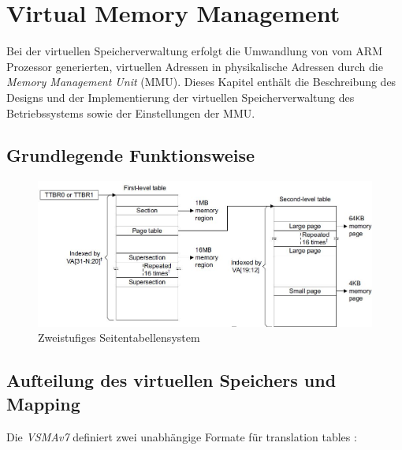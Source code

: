 \section{Virtual Memory Management}

Bei der virtuellen Speicherverwaltung erfolgt die Umwandlung von vom ARM Prozessor generierten, virtuellen Adressen in physikalische Adressen durch die \emph{Memory Management Unit} (MMU). Dieses Kapitel enthält die Beschreibung des Designs und der Implementierung der virtuellen Speicherverwaltung des Betriebssystems sowie der Einstellungen der MMU.\\

\subsection{Grundlegende Funktionsweise}

\begin{figure}[H]
	\includegraphics[scale=0.7]{figures/addressTranslation}
	\caption{Zweistufiges Seitentabellensystem \cite[S. B3-1325]{ARM:ARM}}
	\label{fig:}
\end{figure}

\subsection{Aufteilung des virtuellen Speichers und Mapping}

Die \emph{VSMAv7} definiert zwei unabhängige Formate für translation tables \cite[S. B3-1318]{ARM:ARM}:

